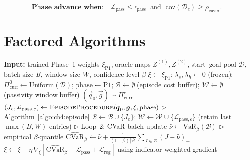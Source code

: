 \begin{equation}
  \textbf{Phase advance when:}\quad
  \mathcal{L}_{\mathrm{pass}} \leq \epsilon_{\mathrm{pass}}
  \;\text{ and }\;
  \mathrm{cov}(\mathcal{D}_e) \geq \rho_{\mathrm{cover}}.
  \label{eq:ch4:advance}
\end{equation}

\section{Factored Algorithms}
\label{sec:ch4:algorithms}

\begin{algorithm}[t]
\caption{Stage~2 Outer Curriculum Loop (with CVaR minibatch and moving-window transition)}
\label{algo:ch4:curriculum}
\begin{algorithmic}[1]
\STATE \textbf{Input:} trained Phase~1 weights $\xi_{\mathrm{P1}}$,
       oracle maps $Z^{(1)}, Z^{(2)}$, start--goal pool $\mathcal{D}$,
       batch size $B$, window size $W$, confidence level $\beta$
\STATE $\xi \leftarrow \xi_{\mathrm{P1}}$;\;
       $\lambda_s,\lambda_h \leftarrow 0$ (frozen);\;
       $\Pi^0_{\mathrm{curr}} \leftarrow \mathrm{Uniform}(\mathcal{D})$;\;
       $\mathrm{phase} \leftarrow \mathrm{P1}$;\;
       $\mathcal{B} \leftarrow \emptyset$ (episode cost buffer);\;
       $\mathcal{W} \leftarrow \emptyset$ (passivity window buffer)
  \STATE $(\vec{q}_0,\vec{g}) \sim \Pi^e_{\mathrm{curr}}$
  \STATE $(J_e,\mathcal{L}_{\mathrm{pass},e})
         \leftarrow \textsc{EpisodeProcedure}(\vec{q}_0,\vec{g},\xi,\mathrm{phase})$
         \hfill $\triangleright$ Algorithm~\ref{algo:ch4:episode}
  \STATE $\mathcal{B} \leftarrow \mathcal{B} \cup \{J_e\}$;\;
         $\mathcal{W} \leftarrow \mathcal{W} \cup \{\mathcal{L}_{\mathrm{pass},e}\}$
         (retain last $\max(B,W)$ entries)
   \hfill $\triangleright$ Loop~2: CVaR batch update
    \STATE $\hat\nu \leftarrow \mathrm{VaR}_\beta(\mathcal{B})$ \hfill $\triangleright$ empirical $\beta$-quantile
    \STATE $\widehat{\mathrm{CVaR}}_\beta \leftarrow
           \hat\nu + \tfrac{1}{(1-\beta)|\mathcal{B}|}
           \sum_{J\in\mathcal{B}}(J - \hat\nu)_+$
    \STATE $\xi \leftarrow \xi - \eta\,\nabla_\xi\!\left[
           \widehat{\mathrm{CVaR}}_\beta + \mathcal{L}_{\mathrm{pass}} + \mathcal{L}_{\mathrm{reg}}
           \right]$ \hfill using indicator-weighted gradient

\end{algorithmic}
\end{algorithm}
